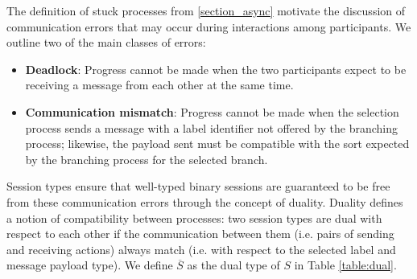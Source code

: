 The definition of stuck processes from {\ref{section_async}} motivate the discussion of communication errors that may occur during interactions among participants. We outline two of the main classes of errors:

\begin{itemize}
\item \textbf{Deadlock}: Progress cannot be made when the two participants expect to be receiving a message from each other at the same time.
\item \textbf{Communication mismatch}: Progress cannot be made when the selection process sends a message with a label identifier not offered by the branching process; likewise, the payload sent must be compatible with the sort expected by the branching process for the selected branch.
\end{itemize}

Session types ensure that well-typed binary sessions are guaranteed to be free from these communication errors through the concept of {duality}. Duality defines a notion of {compatibility} between processes: two session types are dual with respect to each other if the communication between them (i.e. pairs of sending and receiving actions) always match (i.e. with respect to the selected label and message payload type). We define $\overline{S}$ as the dual type of $S$ in Table \ref{table:dual}.

\renewcommand{\arraystretch}{1.2}
\begin{center}
\begin{tabular}{rcl}
\end{tabular}
\label{table:dual}
\end{center}
\renewcommand{\arraystretch}{1}


